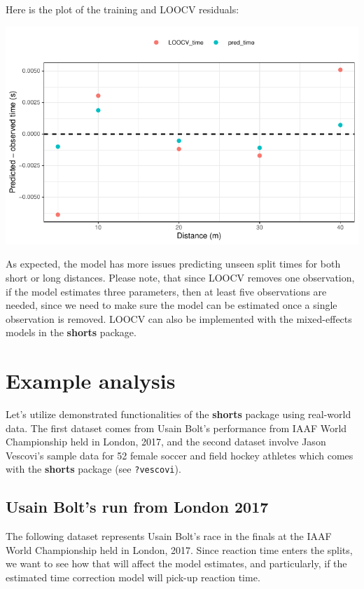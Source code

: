\documentclass[fleqn,10pt,lineno]{wlpeerj} %
\begin{document}
Here is the plot of the training and LOOCV residuals:

\begin{center}\includegraphics[width=0.9\linewidth]{paper_files/figure-latex/unnamed-chunk-52-1} \end{center}

As expected, the model has more issues predicting unseen split times for both short or long distances. Please note, that since LOOCV removes one observation, if the model estimates three parameters, then at least five observations are needed, since we need to make sure the model can be estimated once a single observation is removed. LOOCV can also be implemented with the mixed-effects models in the \textbf{shorts} package.

\hypertarget{example-analysis}{%
\section{Example analysis}\label{example-analysis}}

Let's utilize demonstrated functionalities of the \textbf{shorts} package using real-world data. The first dataset comes from Usain Bolt's performance from IAAF World Championship held in London, 2017, and the second dataset involve Jason Vescovi's sample data for 52 female soccer and field hockey athletes which comes with the \textbf{shorts} package (see \texttt{?vescovi}).

\hypertarget{usain-bolts-run-from-london-2017}{%
\subsection{Usain Bolt's run from London 2017}\label{usain-bolts-run-from-london-2017}}

The following dataset represents Usain Bolt's race in the finals at the IAAF World Championship held in London, 2017. Since reaction time enters the splits, we want to see how that will affect the model estimates, and particularly, if the estimated time correction model will pick-up reaction time.
\end{document}
